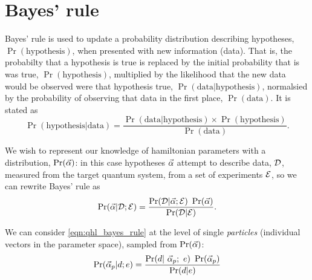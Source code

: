 \section{Bayes' rule}
Bayes' rule is used to update a probability distribution describing hypotheses, $\Pr(\textrm{hypothesis})$, when presented with new information (data).
That is, the probabilty that a hypothesis is true is replaced
    by the initial probability that is was true, $\Pr(\textrm{hypothesis})$, multiplied by 
    the  \gls{likelihood} that the new data would be observed were that hypothesis true, 
    $\Pr(\textrm{data} | \textrm{hypothesis})$, 
    normalsied by the probability of observing that data in the first place, $\Pr(\textrm{data})$. 
It is stated as
    \begin{equation}\label{eqn:bayes_rule}
        \Pr( \textrm{hypothesis} | \textrm{data} ) = 
        \frac{ \Pr( \textrm{data} | \textrm{hypothesis} ) \times \Pr( \textrm{hypothesis} )}{ \Pr(\textrm{data})}.
    \end{equation}
\par 
We wish to represent our knowledge of \gls{hamiltonian} parameters with a distribution, $\Pr(\vec{\alpha})$:
    in this case hypotheses $\vec{\alpha}$ attempt to describe data, ${ \mathcal{D} }$, measured from the target quantum system,  
    from a set of \glspl{experiment} ${ \mathcal{E} }$, so we can rewrite Bayes' rule as 
\begin{equation}\label{eqn:qhl_bayes_rule}
    \Pr(\vec{\alpha} | \expdata; \expset) = \frac{\Pr(\expdata| \vec{\alpha}; \expset) \ \Pr(\vec{\alpha})}{\Pr(\expdata|\expset)}.
\end{equation}

We can consider \cref{eqn:qhl_bayes_rule} at the level of single \emph{\glspl{particle}} (individual vectors in the parameter space), 
    sampled from $\Pr(\vec{\alpha})$:
    \begin{equation}\label{eqn:particle_bayes_rule}
        \Pr(\vec{\alpha}_p | d; e) = \frac{ \Pr(d | \ \vec{\alpha}_p; \ e ) \ \Pr(\vec{\alpha}_p) } {\Pr(d | e)}
    \end{equation}

